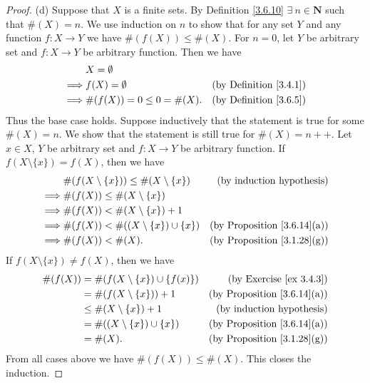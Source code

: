 \begin{proof}{(d)}
    Suppose that \(X\) is a finite sets.
    By Definition \ref{3.6.10} \(\exists\ n \in \mathbf{N}\) such that \(\#(X) = n\).
    We use induction on \(n\) to show that for any set \(Y\) and any function \(f : X \to Y\) we have \(\#(f(X)) \leq \#(X)\).
    For \(n = 0\), let \(Y\) be arbitrary set and \(f : X \to Y\) be arbitrary function.
    Then we have
    \begin{align*}
                 & X = \emptyset                                                     \\
        \implies & f(X) = \emptyset             & \text{(by Definition \ref{3.4.1})} \\
        \implies & \#(f(X)) = 0 \leq 0 = \#(X). & \text{(by Definition \ref{3.6.5})}
    \end{align*}
    Thus the base case holds.
    Suppose inductively that the statement is true for some \(\#(X) = n\).
    We show that the statement is still true for \(\#(X) = n++\).
    Let \(x \in X\), \(Y\) be arbitrary set and \(f : X \to Y\) be arbitrary function.
    If \(f(X \setminus \{x\}) = f(X)\), then we have
    \begin{align*}
                 & \#(f(X \setminus \{x\})) \leq \#(X \setminus \{x\}) & \text{(by induction hypothesis)}        \\
        \implies & \#(f(X)) \leq \#(X \setminus \{x\})                                                           \\
        \implies & \#(f(X)) < \#(X \setminus \{x\}) + 1                                                          \\
        \implies & \#(f(X)) < \#((X \setminus \{x\}) \cup \{x\})       & \text{(by Proposition \ref{3.6.14}(a))} \\
        \implies & \#(f(X)) < \#(X).                                   & \text{(by Proposition \ref{3.1.28}(g))}
    \end{align*}
    If \(f(X \setminus \{x\}) \neq f(X)\), then we have
    \begin{align*}
        \#(f(X)) & = \#(f(X \setminus \{x\}) \cup \{f(x)\}) & \text{(by Exercise \ref{ex 3.4.3})}     \\
                 & = \#(f(X \setminus \{x\})) + 1           & \text{(by Proposition \ref{3.6.14}(a))} \\
                 & \leq \#(X \setminus \{x\}) + 1           & \text{(by induction hypothesis)}        \\
                 & = \#((X \setminus \{x\}) \cup \{x\})     & \text{(by Proposition \ref{3.6.14}(a))} \\
                 & = \#(X).                                 & \text{(by Proposition \ref{3.1.28}(g))}
    \end{align*}
    From all cases above we have \(\#(f(X)) \leq \#(X)\).
    This closes the induction.


\end{proof}
